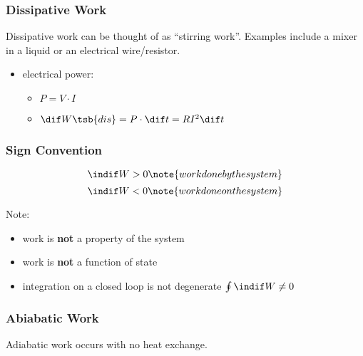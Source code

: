 \documentclass{article}
\begin{document}
\subsubsection{Dissipative Work}

Dissipative work can be thought of as ``stirring work''. Examples include a mixer in a liquid or an electrical wire/resistor.

\begin{itemize}
    \item electrical power:
    \begin{itemize}
        \item $P = V \cdot I$
        \item $\dif W\tsb{dis} = P \cdot \dif t = R I^2 \dif t$
    \end{itemize}
\end{itemize}

\subsubsection{Sign Convention}

\[ \indif W > 0 \note{work done by the system} \]
\[ \indif W < 0 \note{work done on the system} \]

Note:

\begin{itemize}
    \item work is \textbf{not} a property of the system
    \item work is \textbf{not} a function of state
    \item integration on a closed loop is not degenerate $\oint \indif W \neq 0$
\end{itemize}

\subsubsection{Abiabatic Work}

Adiabatic work occurs with no heat exchange.

\begin{center}
\end{center}
\end{document}
